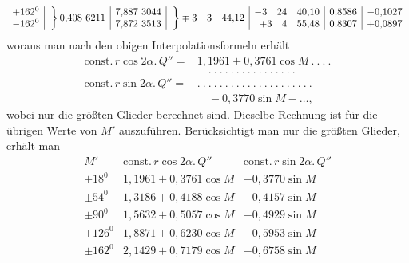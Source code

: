 \[\begin{array}{r|c|r|c|r|r|r}
\begin{array}{@{}r@{}}+162^{0}\\-162^{0}\end{array}&\left.\vphantom{\begin{array}{c}0\\0\end{array}}\right\}0{,}408\ 6211&\begin{array}{@{}r@{}}7{,}887\ 3044\\7{,}872\ 3513\end{array}&\left.\vphantom{\begin{array}{c}0\\0\end{array}}\right\}\mp3\quad3\quad44{,}12&\begin{array}{@{}r@{}}-3\quad24\quad40{,}10\\+3\quad4\quad55{,}48\end{array}&\begin{array}{@{}r@{}}0{,}8586\\0{,}8307\end{array}&\begin{array}{@{}r@{}}-0{,}1027\\+0{,}0897\end{array}
\end{array}
\]
\endgroup
woraus man nach den obigen Interpolationsformeln erhält
\[
\begin{aligned}
\mathrm{const.}\,r\cos2\alpha.\,Q''={}&1{,}1961+0{,}3761\cos M\ .\ .\ .\ .\\
&\quad .\ .\ .\ .\ .\ .\ .\ .\ .\ .\ .\ .\ .\ .\ .\ .\\
\mathrm{const.}\,r\sin2\alpha.\,Q''={}&.\ .\ .\ .\ .\ .\ .\ .\ .\ .\ .\ .\ .\ .\ .\ .\ .\ .\ .\ .\ .\\
&\quad-0{,}3770\sin M-\ldots,
\end{aligned}
\]
wobei nur die größten Glieder berechnet sind. Dieselbe Rechnung ist für die übrigen Werte von \(M'\) auszuführen. Berücksichtigt man nur die größten Glieder, erhält man
\[
\begin{array}{r|l|l}
M'&\mathrm{const.}\,r\cos2\alpha.\,Q''&\mathrm{const.}\,r\sin2\alpha.\,Q''\\\hline
\pm18^{0}&1{,}1961+0{,}3761\cos M&-0{,}3770\sin M\\
\pm54^{0}&1{,}3186+0{,}4188\cos M&-0{,}4157\sin M\\
\pm90^{0}&1{,}5632+0{,}5057\cos M&-0{,}4929\sin M\\
\pm126^{0}&1{,}8871+0{,}6230\cos M&-0{,}5953\sin M\\
\pm162^{0}&2{,}1429+0{,}7179\cos M&-0{,}6758\sin M
\end{array}
\]
